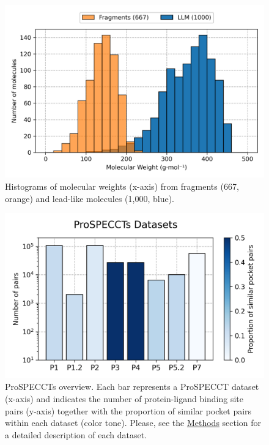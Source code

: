 \begin{figure}[htbp]
  \centering
  \includegraphics[width=0.65\linewidth]{figures/PocketVec/Supplementary/FigS2.png}
  \caption{
  Histograms of molecular weights (x-axis) from fragments (667, orange) and lead-like molecules (1,000, blue).
  }
  \label{PocketVec_FigS2}
\end{figure}


\begin{figure}[htbp]
  \centering
  \includegraphics[width=0.75\linewidth]{figures/PocketVec/Supplementary/FigS3.png}
  \caption{
  ProSPECCTs overview. Each bar represents a ProSPECCT dataset (x-axis) and indicates the number of protein-ligand binding site pairs (y-axis) together with the proportion of similar pocket pairs within each dataset (color tone). Please, see the \hyperref[PocketVec_Methods]{Methods} section for a detailed description of each dataset.
  }
  \label{PocketVec_FigS3}
\end{figure}


